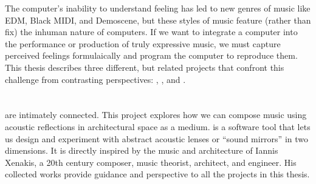The computer's inability to understand feeling has led to new genres
of music like EDM, Black
MIDI, and Demoscene, but these styles of music
feature (rather than fix) the inhuman nature of computers. If we want
to integrate a computer into the performance or production of truly
expressive music, we must capture perceived feelings formulaically
and program the computer to reproduce them. This thesis describes
three different, but related projects that confront this challenge from
contrasting perspectives: , \polytempic, and \thesis.

\section{}
\label{sec:refmod-intro}
 are intimately connected. This project
explores how we can compose music using acoustic reflections in
architectural space as a medium.  is a software tool that lets
us design and experiment with abstract acoustic lenses or ``sound
mirrors'' in two dimensions. It is directly inspired by the music and
architecture of Iannis Xenakis, a 20th century composer, music
theorist, architect, and engineer. His collected works provide guidance
and perspective to all the projects in this thesis.

\section{\polytempic}
\label{sec:polytempic-intro}

